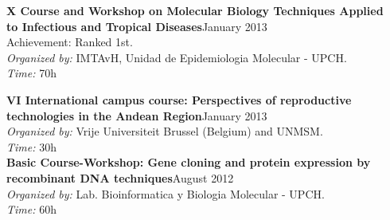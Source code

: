 \documentclass[margin,line]{res}
\begin{document}
\begin{resume}
{\bf X Course and Workshop on Molecular Biology Techniques Applied \\to Infectious and Tropical Diseases}\hfill {January 2013}\\
Achievement: Ranked 1st.\\
\textit{Organized by:} IMTAvH, Unidad de Epidemiologia Molecular - UPCH.\\
\textit{Time:} 70h

{\bf VI International campus course: Perspectives of reproductive \\technologies in the Andean Region}\hfill {January 2013}\\
\textit{Organized by:} Vrije Universiteit Brussel (Belgium) and UNMSM.\\
\textit{Time:} 30h\\

{\bf Basic Course-Workshop: Gene cloning and protein expression by \\recombinant DNA techniques}\hfill {August 2012}\\
\textit{Organized by:} Lab. Bioinformatica y Biologia Molecular - UPCH.\\
\textit{Time:} 60h




\end{resume}
\end{document}
